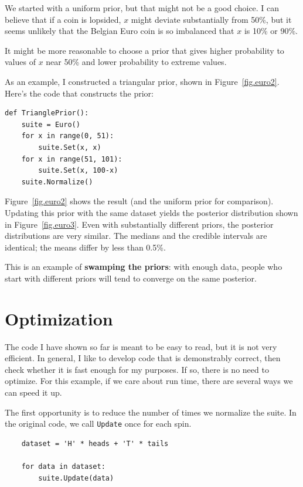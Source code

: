 \documentclass[12pt]{book}
\begin{document}
We started with a uniform prior, but that might not be a good
choice.  I can believe
that if a coin is lopsided, $x$ might deviate substantially from
50\%, but it seems unlikely that the Belgian Euro coin is so
imbalanced that $x$ is 10\% or 90\%.

It might be more reasonable to choose a prior that gives
higher probability to values of $x$ near 50\% and lower probability
to extreme values.

As an example, I constructed a triangular prior, shown in
Figure~\ref{fig.euro2}.  Here's the code that constructs the prior:

\begin{verbatim}
def TrianglePrior():
    suite = Euro()
    for x in range(0, 51):
        suite.Set(x, x)
    for x in range(51, 101):
        suite.Set(x, 100-x) 
    suite.Normalize()
\end{verbatim}

Figure~\ref{fig.euro2} shows the result (and the uniform prior for
comparison).
Updating this prior with the same dataset yields the posterior
distribution shown in Figure~\ref{fig.euro3}.  Even with substantially
different priors, the posterior distributions are very similar.  The
medians and the credible intervals are identical; the means differ by
less than 0.5\%.  

This is an example of {\bf swamping the priors}: with enough
data, people who start with different priors will tend to
converge on the same posterior.


\section{Optimization}

The code I have shown so far is meant to be easy to read, but it
is not very efficient.  In general, I like to develop code that
is demonstrably correct, then check whether it is fast enough for
my purposes.  If so, there is no need to optimize.
For this example, if we care about run time,
there are several ways we can speed it up.

The first opportunity is to reduce the number of times we
normalize the suite.
In the original code, we call \verb"Update" once for each spin.

\begin{verbatim}
    dataset = 'H' * heads + 'T' * tails

    for data in dataset:
        suite.Update(data)
\end{verbatim}
\end{document}
